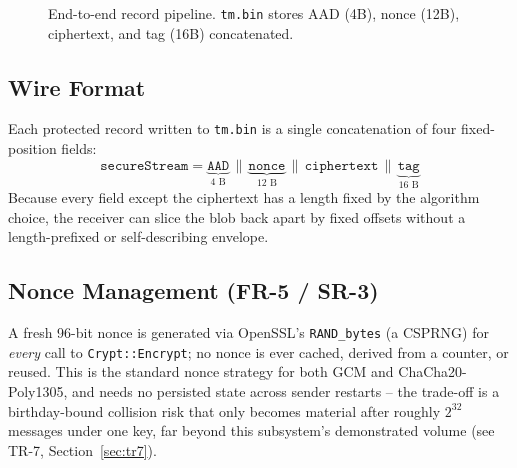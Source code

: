 \documentclass[11pt]{article}
\begin{document}
\begin{figure}[h!]
\centering
{}
\caption{End-to-end record pipeline. \texttt{tm.bin} stores AAD (4B), nonce
(12B), ciphertext, and tag (16B) concatenated.}
\end{figure}

\subsection{Wire Format}

Each protected record written to \texttt{tm.bin} is a single concatenation of four
fixed-position fields:
\[
\texttt{secureStream} = \underbrace{\texttt{AAD}}_{4\text{ B}} \,\|\, \underbrace{\texttt{nonce}}_{12\text{ B}} \,\|\, \texttt{ciphertext} \,\|\, \underbrace{\texttt{tag}}_{16\text{ B}}
\]
Because every field except the ciphertext has a length fixed by the algorithm choice,
the receiver can slice the blob back apart by fixed offsets without a length-prefixed
or self-describing envelope.

\subsection{Nonce Management (FR-5 / SR-3)}

A fresh 96-bit nonce is generated via OpenSSL's \texttt{RAND\_bytes} (a CSPRNG) for
\emph{every} call to \texttt{Crypt::Encrypt}; no nonce is ever cached, derived from a
counter, or reused. This is the standard nonce strategy for both GCM and
ChaCha20-Poly1305, and needs no persisted state across sender restarts -- the
trade-off is a birthday-bound collision risk that only becomes material after roughly
$2^{32}$ messages under one key, far beyond this subsystem's demonstrated volume (see
TR-7, Section~\ref{sec:tr7}).
\end{document}
